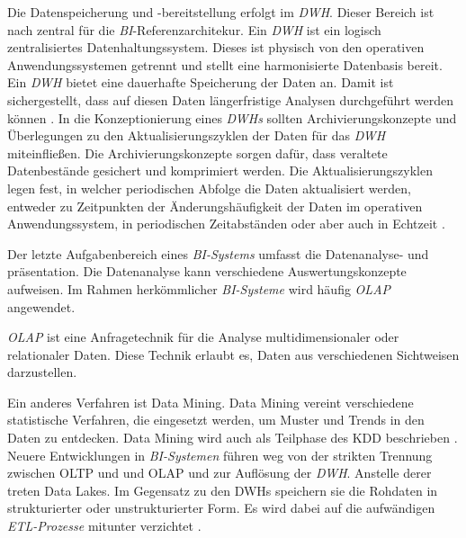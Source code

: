Die Datenspeicherung und -bereitstellung erfolgt im \textit{\acrshort{DWH}}. Dieser Bereich ist nach \citeauthor{linden_geschaftsmodellbasierte_2016} zentral für die 
\textit{\acrshort{BI}}-Referenzarchitekur. Ein \textit{\acrlong{DWH}} ist ein logisch zentralisiertes Datenhaltungssystem. Dieses ist physisch 
von den operativen Anwendungssystemen getrennt und stellt eine harmonisierte Datenbasis bereit. Ein \textit{\acrlong{DWH}} bietet eine dauerhafte 
Speicherung der Daten an. Damit ist sichergestellt, dass auf diesen Daten längerfristige Analysen durchgeführt werden können \cite[vgl.][136]{linden_geschaftsmodellbasierte_2016}.
In die Konzeptionierung eines \textit{\acrlong{DWH}s} sollten Archivierungskonzepte und Überlegungen zu den Aktualisierungszyklen der Daten für das \textit{\acrshort{DWH}}
miteinfließen. Die Archivierungskonzepte sorgen dafür, dass veraltete Datenbestände gesichert und komprimiert werden.
Die Aktualisierungszyklen legen fest, in welcher periodischen Abfolge die Daten aktualisiert werden, entweder zu Zeitpunkten der Änderungshäufigkeit
der Daten im operativen Anwendungssystem, in periodischen Zeitabständen oder aber auch in Echtzeit \cite[vgl.][137]{linden_geschaftsmodellbasierte_2016}.



Der letzte Aufgabenbereich eines \textit{\acrshort{BI}-Systems} umfasst die Datenanalyse- und präsentation. Die Datenanalyse kann verschiedene Auswertungskonzepte aufweisen.
Im Rahmen herkömmlicher \textit{\acrshort{BI}-Systeme} wird häufig \textit{\acrshort{OLAP}} angewendet.

\textit{\acrshort{OLAP}} ist eine Anfragetechnik 
für die Analyse multidimensionaler oder relationaler Daten. Diese Technik erlaubt es, Daten aus verschiedenen Sichtweisen darzustellen. 

Ein anderes Verfahren ist Data Mining. Data Mining vereint verschiedene statistische Verfahren, die eingesetzt werden, um Muster und Trends in den
Daten zu entdecken. Data Mining wird auch als Teilphase des \acrfull{KDD} beschrieben \cite[vgl.][142 f.]{linden_geschaftsmodellbasierte_2016}.
Neuere Entwicklungen in \textit{\acrshort{BI}-Systemen} führen weg von der strikten Trennung zwischen \acrshort{OLTP} und und \acrshort{OLAP} und zur Auflösung der \textit{\acrshort{DWH}}. 
Anstelle derer treten Data Lakes. Im Gegensatz zu den \acrlong{DWH}s speichern sie die Rohdaten in strukturierter oder unstrukturierter Form. 
Es wird dabei auf die aufwändigen \textit{\acrshort{ETL}-Prozesse} mitunter verzichtet \cite[Vgl.][86]{gronwald_integrierte_2020}.


